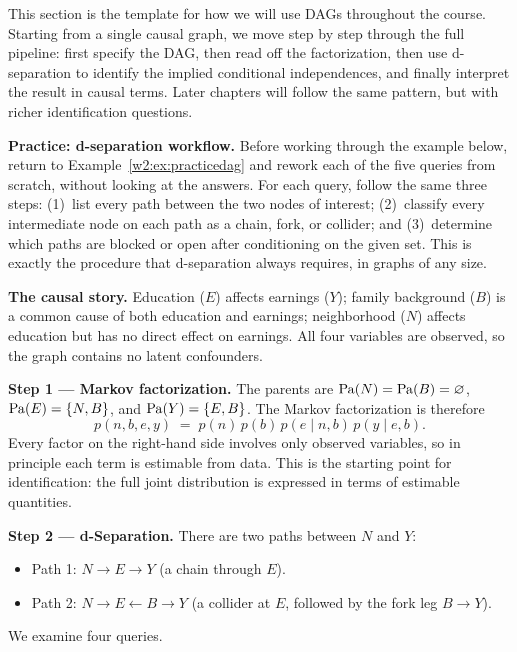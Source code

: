 \documentclass[master.tex]{subfiles}
\begin{document}
This section is the template for how we will use DAGs throughout the course.
Starting from a single causal graph, we move step by step through the full
pipeline: first specify the DAG, then read off the factorization, then use
d-separation to identify the implied conditional independences, and finally
interpret the result in causal terms.
Later chapters will follow the same pattern, but with richer identification
questions.

\medskip
\noindent\textbf{Practice: d-separation workflow.}
Before working through the example below, return to
Example~\ref{w2:ex:practicedag} and rework each of the five queries from
scratch, without looking at the answers.
For each query, follow the same three steps:
(1)~list every path between the two nodes of interest;
(2)~classify every intermediate node on each path as a chain, fork, or
collider; and
(3)~determine which paths are blocked or open after conditioning on the
given set.
This is exactly the procedure that d-separation always requires, in graphs
of any size.

\medskip
\noindent\textbf{The causal story.}
Education ($E$) affects earnings ($Y$); family background ($B$) is a
common cause of both education and earnings; neighborhood ($N$) affects
education but has no direct effect on earnings.  All four variables are
observed, so the graph contains no latent confounders.

\begin{center}
\end{center}

\medskip
\noindent\textbf{Step 1 --- Markov factorization.}
The parents are $\mathrm{Pa}(N) = \mathrm{Pa}(B) = \varnothing$,
$\mathrm{Pa}(E) = \{N, B\}$, and $\mathrm{Pa}(Y) = \{E, B\}$.
The Markov factorization is therefore
\[
  p(n, b, e, y) \;=\; p(n)\,p(b)\,p(e \mid n, b)\,p(y \mid e, b).
\]
Every factor on the right-hand side involves only observed variables, so
in principle each term is estimable from data.
This is the starting point for identification: the full joint distribution
is expressed in terms of estimable quantities.

\medskip
\noindent\textbf{Step 2 --- d-Separation.}
There are two paths between $N$ and $Y$:
\begin{itemize}
  \item Path 1: $N \to E \to Y$ (a chain through $E$).
  \item Path 2: $N \to E \leftarrow B \to Y$ (a collider at $E$, followed
        by the fork leg $B \to Y$).
\end{itemize}
We examine four queries.
\end{document}
